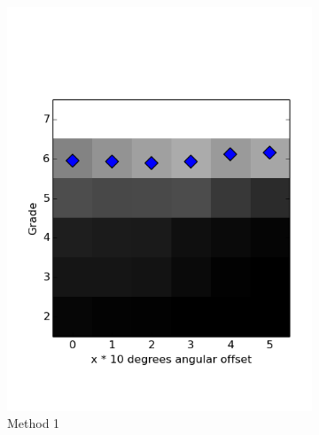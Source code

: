 \documentclass[a4paper,11pt]{report}
\begin{document}
%
%
 \begin{figure}
    \centering
    \begin{subfigure}[b]{0.45\textwidth}
        \includegraphics[width=\textwidth]{figures/grade_cumulative.png}
        \caption{Method 1}
        \label{fig:cumulative1}
    \end{subfigure}
    \begin{subfigure}[b]{0.45\textwidth}

\end{subfigure}
\end{figure}
\end{document}
